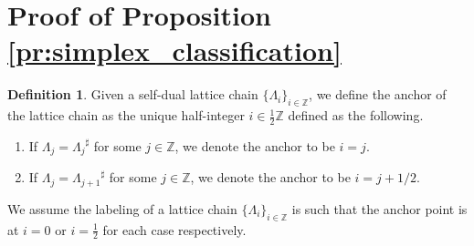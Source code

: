 \documentclass{eptcs}
\theoremstyle{remark}
\theoremstyle{definition}
\newtheorem{definition}[theorem]{Definition}
\newcommand{\dual}[1]{{#1}^{\sharp}}
\begin{document}
\appendix

\section{Proof of Proposition \ref{pr:simplex_classification}}
\label{ap:simplex_classification}
\begin{definition}
    Given a self-dual lattice chain $\{\Lambda_i\}_{i \in \mathbb{Z}}$, we define the anchor of the lattice chain  as the unique half-integer $i \in \tfrac{1}{2}\mathbb{Z}$ defined as the following.
\begin{enumerate}
    \item If $\Lambda_j = \dual{\Lambda_j}$ for some $j \in \mathbb{Z}$, we denote the anchor to be $i=j$.
    \item If $\Lambda_j = \dual{\Lambda_{j+1}}$ for some $j \in \mathbb{Z}$, we denote the anchor to be $i=j+1/2$. 
\end{enumerate}
\end{definition}

We assume the labeling of a lattice chain $\{\Lambda_i\}_{i \in \mathbb{Z}}$ is such that the anchor point is at $i=0$ or $i=\frac{1}{2}$ for each case respectively.
\end{document}
